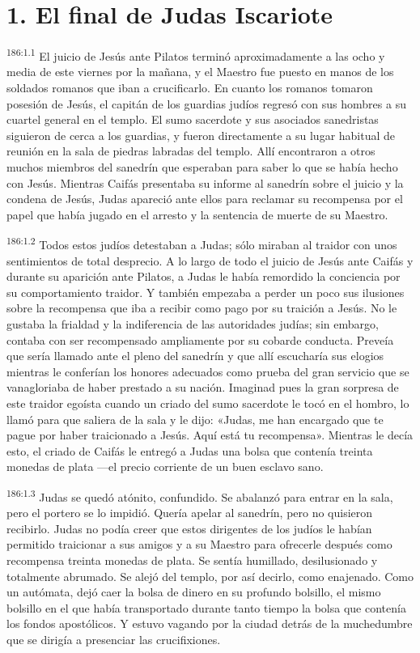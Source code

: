 \section*{1. El final de Judas Iscariote}
\par 
\textsuperscript{186:1.1} El juicio de Jesús ante Pilatos terminó aproximadamente a las ocho y media de este viernes por la mañana, y el Maestro fue puesto en manos de los soldados romanos que iban a crucificarlo. En cuanto los romanos tomaron posesión de Jesús, el capitán de los guardias judíos regresó con sus hombres a su cuartel general en el templo. El sumo sacerdote y sus asociados sanedristas siguieron de cerca a los guardias, y fueron directamente a su lugar habitual de reunión en la sala de piedras labradas del templo. Allí encontraron a otros muchos miembros del sanedrín que esperaban para saber lo que se había hecho con Jesús. Mientras Caifás presentaba su informe al sanedrín sobre el juicio y la condena de Jesús, Judas apareció ante ellos para reclamar su recompensa por el papel que había jugado en el arresto y la sentencia de muerte de su Maestro.

\par 
\textsuperscript{186:1.2} Todos estos judíos detestaban a Judas; sólo miraban al traidor con unos sentimientos de total desprecio. A lo largo de todo el juicio de Jesús ante Caifás y durante su aparición ante Pilatos, a Judas le había remordido la conciencia por su comportamiento traidor. Y también empezaba a perder un poco sus ilusiones sobre la recompensa que iba a recibir como pago por su traición a Jesús. No le gustaba la frialdad y la indiferencia de las autoridades judías; sin embargo, contaba con ser recompensado ampliamente por su cobarde conducta. Preveía que sería llamado ante el pleno del sanedrín y que allí escucharía sus elogios mientras le conferían los honores adecuados como prueba del gran servicio que se vanagloriaba de haber prestado a su nación. Imaginad pues la gran sorpresa de este traidor egoísta cuando un criado del sumo sacerdote le tocó en el hombro, lo llamó para que saliera de la sala y le dijo: «Judas, me han encargado que te pague por haber traicionado a Jesús. Aquí está tu recompensa». Mientras le decía esto, el criado de Caifás le entregó a Judas una bolsa que contenía treinta monedas de plata ---el precio corriente de un buen esclavo sano.

\par 
\textsuperscript{186:1.3} Judas se quedó atónito, confundido. Se abalanzó para entrar en la sala, pero el portero se lo impidió. Quería apelar al sanedrín, pero no quisieron recibirlo. Judas no podía creer que estos dirigentes de los judíos le habían permitido traicionar a sus amigos y a su Maestro para ofrecerle después como recompensa treinta monedas de plata. Se sentía humillado, desilusionado y totalmente abrumado. Se alejó del templo, por así decirlo, como enajenado. Como un autómata, dejó caer la bolsa de dinero en su profundo bolsillo, el mismo bolsillo en el que había transportado durante tanto tiempo la bolsa que contenía los fondos apostólicos. Y estuvo vagando por la ciudad detrás de la muchedumbre que se dirigía a presenciar las crucifixiones.

